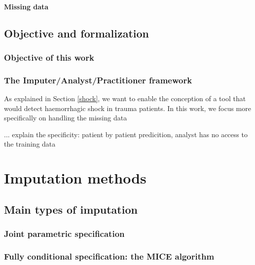 \documentclass[12pt, a4paper]{memoir}
\begin{document}
			\subsubsection{Missing data}
	\section{Objective and formalization}
		\subsection{Objective of this work}
		\subsection{The Imputer/Analyst/Practitioner framework}
	
As explained in Section \ref{shock}, we want to enable the conception of a tool that would detect haemorrhagic shock in trauma patients. In this work, we focus more specifically on handling the missing data

... explain the specificity: patient by patient predicition, analyst has no access to the training data


\chapter{Imputation methods}
\label{imputation}
	\section{Main types of imputation}
		\subsection{Joint parametric specification}
		\subsection{Fully conditional specification: the MICE algorithm}
\end{document}
